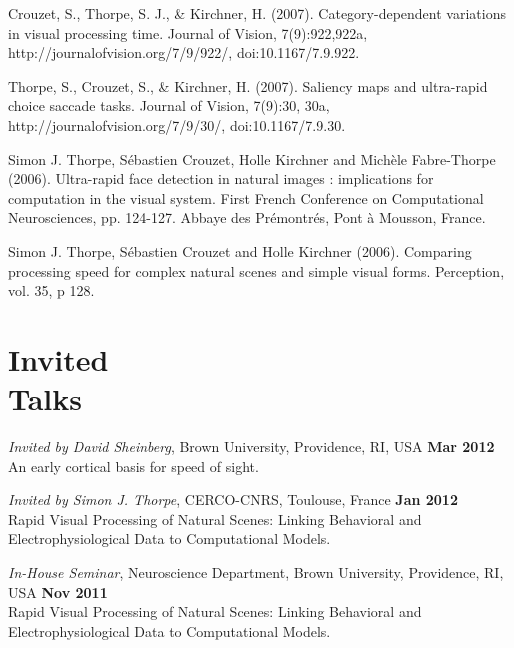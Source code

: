 \documentclass[margin,line]{resume}
\begin{document}
\begin{resume}
\vspace{-2mm} Crouzet, S., Thorpe, S. J., \& Kirchner, H. (2007). Category-dependent variations in visual processing time. Journal of Vision, 7(9):922,922a, http://journalofvision.org/7/9/922/, doi:10.1167/7.9.922.

\vspace{-2mm} Thorpe, S., Crouzet, S., \& Kirchner, H. (2007). Saliency maps and ultra-rapid choice saccade tasks. Journal of Vision, 7(9):30, 30a, http://journalofvision.org/7/9/30/, doi:10.1167/7.9.30.

\vspace{-2mm} Simon J. Thorpe, Sébastien Crouzet, Holle Kirchner and Michèle Fabre-Thorpe (2006). Ultra-rapid face detection in natural images : implications for computation in the visual system. First French Conference on Computational Neurosciences, pp. 124-127. Abbaye des Prémontrés, Pont à Mousson, France.

\vspace{-2mm} Simon J. Thorpe, Sébastien Crouzet and Holle Kirchner (2006). Comparing processing speed for complex natural scenes and simple visual forms. Perception, vol. 35, p 128.

\normalsize


    \section{\mysidestyle Invited\\Talks}
    
\footnotesize %

\textit{Invited by David Sheinberg}, Brown University, Providence, RI, USA \hfill \textbf{Mar 2012}\\
An early cortical basis for speed of sight. 

\vspace{-2mm} 
\textit{Invited by Simon J. Thorpe}, CERCO-CNRS, Toulouse, France \hfill \textbf{Jan 2012}\\
Rapid Visual Processing of Natural Scenes: Linking Behavioral and Electrophysiological Data to Computational Models.

\newpage

\vspace{-2mm} 
\textit{In-House Seminar}, Neuroscience Department, Brown University, Providence, RI, USA \hfill \textbf{Nov 2011}\\
Rapid Visual Processing of Natural Scenes: Linking Behavioral and Electrophysiological Data to Computational Models.


\end{resume}
\end{document}
